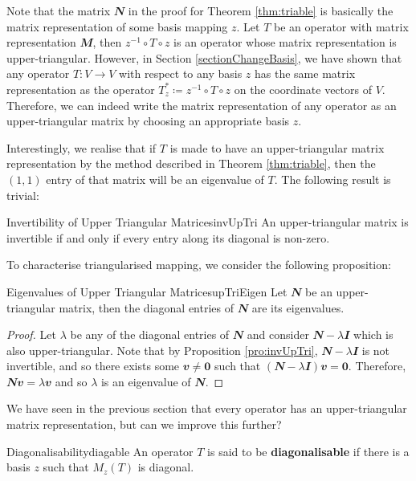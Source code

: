 \documentclass[math, code]{amznotes}
\theoremstyle{remark}
\newcommand{\zero}{\mathbf{0}}
\begin{document}
Note that the matrix $\mathbfit{N}$ in the proof for Theorem \ref{thm:triable} is basically the matrix representation of some basis mapping $z$. Let $T$ be an operator with matrix representation $\mathbfit{M}$, then $z^{-1} \circ T \circ z$ is an operator whose matrix representation is upper-triangular. However, in Section \ref{sectionChangeBasis}, we have shown that any operator $T \colon V \to V$ with respect to any basis $z$ has the same matrix representation as the operator $T^*_z \coloneqq z^{-1} \circ T \circ z$ on the coordinate vectors of $V$. Therefore, we can indeed write the matrix representation of any operator as an upper-triangular matrix by choosing an appropriate basis $z$.

Interestingly, we realise that if $T$ is made to have an upper-triangular matrix representation by the method described in Theorem \ref{thm:triable}, then the $(1, 1)$ entry of that matrix will be an eigenvalue of $T$. The following result is trivial:
\begin{probox}{Invertibility of Upper Triangular Matrices}{invUpTri}
    An upper-triangular matrix is invertible if and only if every entry along its diagonal is non-zero.
\end{probox}
To characterise triangularised mapping, we consider the following proposition:
\begin{probox}{Eigenvalues of Upper Triangular Matrices}{upTriEigen}
    Let $\mathbfit{N}$ be an upper-triangular matrix, then the diagonal entries of $\mathbfit{N}$ are its eigenvalues.
    \tcblower
    \begin{proof}
        Let $\lambda$ be any of the diagonal entries of $\mathbfit{N}$ and consider $\mathbfit{N} - \lambda\mathbfit{I}$ which is also upper-triangular. Note that by Proposition \ref{pro:invUpTri}, $\mathbfit{N} - \lambda\mathbfit{I}$ is not invertible, and so there exists some $\mathbfit{v} \neq \zero$ such that $(\mathbfit{N} - \lambda\mathbfit{I})\mathbfit{v} = \zero$. Therefore, $\mathbfit{Nv} = \lambda\mathbfit{v}$ and so $\lambda$ is an eigenvalue of $\mathbfit{N}$.
    \end{proof}
\end{probox}
We have seen in the previous section that every operator has an upper-triangular matrix representation, but can we improve this further?
\begin{dfnbox}{Diagonalisability}{diagable}
    An operator $T$ is said to be {\color{red} \textbf{diagonalisable}} if there is a basis $z$ such that $M_z\left(T\right)$ is diagonal.
\end{dfnbox}
\end{document}
